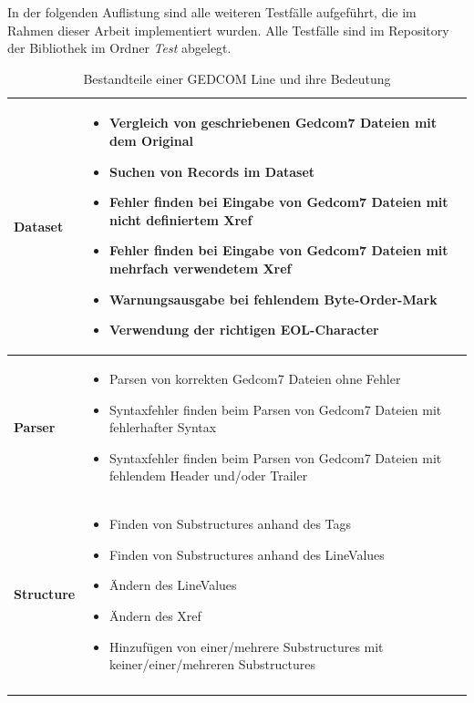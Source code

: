In der folgenden Auflistung sind alle weiteren Testfälle aufgeführt, die im Rahmen dieser Arbeit implementiert wurden. Alle Testfälle sind im Repository der Bibliothek im Ordner \textit{Test} abgelegt. 

\bgroup
\def\arraystretch{1.5}%
\setlength{\tabcolsep}{18pt}
\begin{longtable}{|p{2cm}|p{10cm}|}
	\hline
	\textbf{Dataset} & { \vspace{-1.8em}
		\begin{itemize}
			\item Vergleich von geschriebenen Gedcom7 Dateien mit dem Original
			\item Suchen von Records im Dataset
			\item Fehler finden bei Eingabe von Gedcom7 Dateien mit nicht definiertem Xref
			\item Fehler finden bei Eingabe von Gedcom7 Dateien mit mehrfach verwendetem Xref
			\item Warnungsausgabe bei fehlendem Byte-Order-Mark
			\item Verwendung der richtigen EOL-Character
	\end{itemize}\vspace{-1.6em}}\\
	\hline
	\textbf{Parser} & { \vspace{-1.8em}
		\begin{itemize}
			\item Parsen von korrekten Gedcom7 Dateien ohne Fehler
			\item Syntaxfehler finden beim Parsen von Gedcom7 Dateien mit fehlerhafter Syntax
			\item Syntaxfehler finden beim Parsen von Gedcom7 Dateien mit fehlendem Header und/oder Trailer
		\end{itemize}\vspace{-1.6em}}\\
	\hline
	\textbf{Structure} & { \vspace{-1.8em}
		\begin{itemize}
			\item Finden von Substructures anhand des Tags
			\item Finden von Substructures anhand des LineValues
			\item Ändern des LineValues
			\item Ändern des Xref
			\item Hinzufügen von einer/mehrere Substructures mit keiner/einer/mehreren Substructures
		\end{itemize}\vspace{-1.6em}}\\
	\hline
	\caption{Bestandteile einer GEDCOM Line und ihre Bedeutung} %
	\label{tab: gedcom line}
\end{longtable}
\egroup
\vspace{1em}